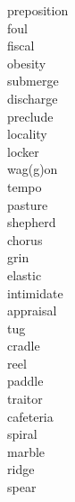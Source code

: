 \documentclass[b5paper, 11pt]{ctexart}
\begin{document}
\begin{multicols*}{3}
\begin{description}
\item[preposition]

\item[foul]

\item[fiscal]

\item[obesity]

\item[submerge]

\item[discharge]

\item[preclude]

\item[locality]

\item[locker]

\item[wag(g)on]

\item[tempo]

\item[pasture]

\item[shepherd]

\item[chorus]

\item[grin]

\item[elastic]

\item[intimidate]

\item[appraisal]

\item[tug]

\item[cradle]

\item[reel]

\item[paddle]

\item[traitor]

\item[cafeteria]

\item[spiral]

\item[marble]

\item[ridge]

\item[spear]


\end{description}
\end{multicols*}
\end{document}
